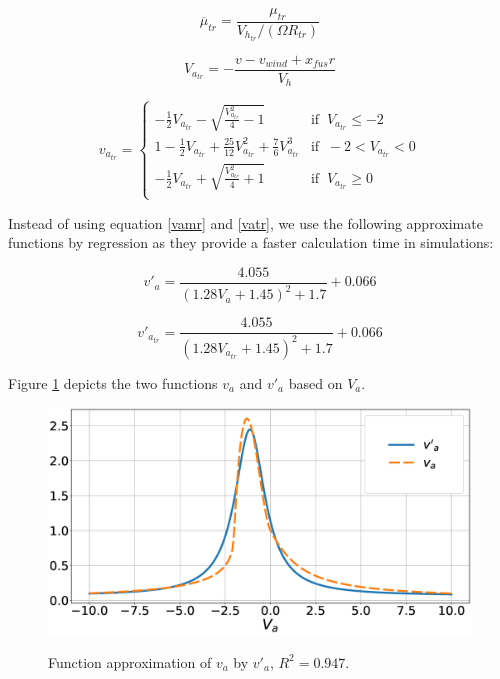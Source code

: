 \begin{equation}
	\overline{\mu}_{tr}=\frac{\mu_{tr}}{V_{h_{tr}}/(\Omega R_{tr})} 
\end{equation}

\begin{equation}
	V_{a_{tr}}=-\frac{v-v_{wind}+x_{fus}r}{V_h}
\end{equation}

\begin{equation}
	v_{a_{tr}} = \left\{
	\begin{array}{ll}
		-\frac{1}{2} V_{a_{tr}}-\sqrt{\frac{V_{a_{tr}}^2}{4}-1} & \mbox{if } \ V_{a_{tr}} 	\leqslant -2 \\
		1-\frac{1}{2} V_{a_{tr}}+\frac{25}{12} V_{a_{tr}}^2 +\frac{7}{6} V_{a_{tr}}^3 & \mbox{if } \ -2<V_{a_{tr}}<0 \\
		-\frac{1}{2} V_{a_{tr}}+\sqrt{\frac{V_{a_{tr}}^2}{4}+1} & \mbox{if } \ V_{a_{tr}}	\geqslant 0 \\
	\end{array}
	\right.
	\label{vatr}
\end{equation}

Instead of using equation \ref{vamr} and \ref{vatr}, we use the following approximate functions by regression as they provide a faster calculation time in simulations:

\begin{equation}
	v'_a = \frac{4.055}{{\left(1.28V_{a}+1.45\right)}^2+1.7}+0.066
\end{equation}

\begin{equation}
	v'_{a_{tr}} = \frac{4.055}{{\left(1.28V_{a_{tr}}+1.45\right)}^2+1.7}+0.066
\end{equation}

Figure \ref{fig_va} depicts the two functions $v_a$ and $v'_a$ based on $V_a$.

\begin{figure}
	\begin{center}
		{\includegraphics[scale=0.3]{va.eps}}
		
		\caption{Function approximation of $v_a$ by $v'_a$, $R^2=0.947$.}
		\label{fig_va}
	\end{center}
\end{figure}

